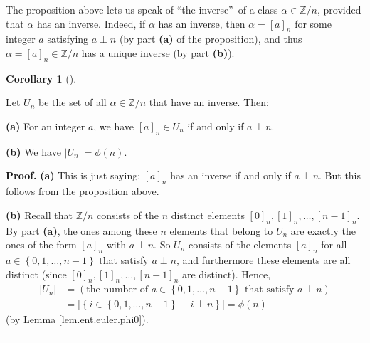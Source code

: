 \documentclass[numbers=enddot,12pt,final,onecolumn,notitlepage]{scrartcl}%
\numberwithin{exer}{subsection}
\theoremstyle{definition}
\newtheorem{coro}[theo]{Corollary}
\newenvironment{corollary}[1][]
{\begin{coro}[#1]\begin{leftbar}}
{\end{leftbar}\end{coro}}
\newenvironment{proof}[1][Proof]{\noindent\textbf{#1.} }{\ \rule{0.5em}{0.5em}}
\begin{document}
The proposition above lets us speak of \textquotedblleft the
inverse\textquotedblright\ of a class $\alpha\in\mathbb{Z}/n$, provided that
$\alpha$ has an inverse. Indeed, if $\alpha$ has an inverse, then
$\alpha=\left[  a\right]  _{n}$ for some integer $a$ satisfying $a\perp n$ (by
part \textbf{(a)} of the proposition), and thus $\alpha=\left[  a\right]
_{n}\in\mathbb{Z}/n$ has a unique inverse (by part \textbf{(b)}).

\begin{corollary}
Let $U_{n}$ be the set of all $\alpha\in\mathbb{Z}/n$ that have an inverse. Then:

\textbf{(a)} For an integer $a$, we have $\left[  a\right]  _{n}\in U_{n}$ if
and only if $a\perp n$.

\textbf{(b)} We have $\left\vert U_{n}\right\vert =\phi\left(  n\right)  $.
\end{corollary}

\begin{proof}
\textbf{(a)} This is just saying: $\left[  a\right]  _{n}$ has an inverse if
and only if $a\perp n$. But this follows from the proposition above.

\textbf{(b)} Recall that $\mathbb{Z}/n$ consists of the $n$ distinct elements
$\left[  0\right]  _{n},\left[  1\right]  _{n},\ldots,\left[  n-1\right]
_{n}$. By part \textbf{(a)}, the ones among these $n$ elements that belong to
$U_{n}$ are exactly the ones of the form $\left[  a\right]  _{n}$ with $a\perp
n$. So $U_{n}$ consists of the elements $\left[  a\right]  _{n}$ for all
$a\in\left\{  0,1,\ldots,n-1\right\}  $ that satisfy $a\perp n$, and
furthermore these elements are all distinct (since $\left[  0\right]
_{n},\left[  1\right]  _{n},\ldots,\left[  n-1\right]  _{n}$ are distinct).
Hence,%
\begin{align*}
\left\vert U_{n}\right\vert  &  =\left(  \text{the number of }a\in\left\{
0,1,\ldots,n-1\right\}  \text{ that satisfy }a\perp n\right) \\
&  =\left\vert \left\{  i\in\left\{  0,1,\ldots,n-1\right\}  \ \mid\ i\perp
n\right\}  \right\vert =\phi\left(  n\right)
\end{align*}
(by Lemma \ref{lem.ent.euler.phi0}).
\end{proof}
\end{document}
